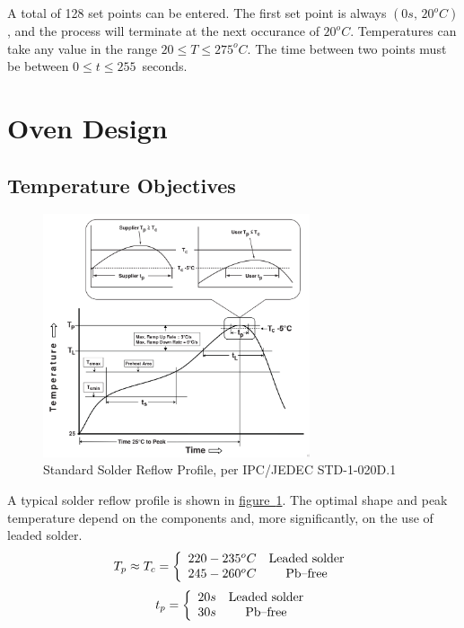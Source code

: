 \documentclass[10pt, twocolumn]{article}
\begin{document}
A total of 128 set points can be entered. The first set point is always $(0s,\,20^{o}C)$,
and the process will terminate at the next occurance of $20^{o}C$.
Temperatures can take any value in the range \mbox{$20\leq T \leq 275^{o}C$.}
The time between two points must be between \mbox{$0\leq t\leq255$ seconds.}

\section{Oven Design}

\subsection{Temperature Objectives}

\begin{figure}
	\centering
	\includegraphics[width=0.7\textwidth]{Figures/standard-reflow-profile.pdf}
	\caption{Standard Solder Reflow Profile, per IPC/JEDEC STD-1-020D.1}
	\label{standard-reflow-profile}
\end{figure}

A typical solder reflow profile is shown in
\hyperref[standard-reflow-profile]{\mbox{figure \ref{standard-reflow-profile}}}.
The optimal shape and peak temperature depend on the components and,
more significantly, on the use of leaded solder.
\begin{equation*}
T_{p}\approx T_{c}=\left\{\begin{array}{c c}
220-235^{o}C	&\textrm{Leaded solder}	\\
245-260^{o}C	&\textrm{Pb--free}	\\
\end{array}\right.
\end{equation*}
\begin{equation*}
t_{p}=\left\{\begin{array}{c c}
20s	&\textrm{Leaded solder}	\\
30s	&\textrm{Pb--free}	\\
\end{array}\right.
\end{equation*}
\end{document}
